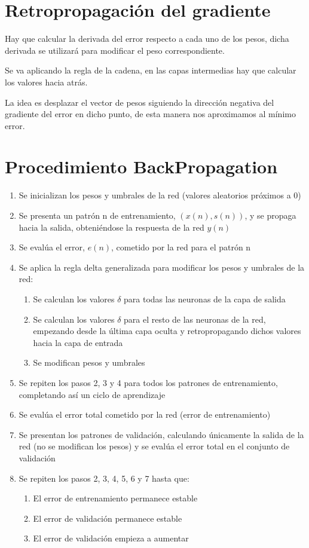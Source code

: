\documentclass[12pt, twoside, openright]{report} %
\begin{document}
\section{Retropropagación del gradiente}
Hay que calcular la derivada del error respecto a cada uno de los pesos, dicha derivada se utilizará para modificar el peso correspondiente.

Se va aplicando la regla de la cadena, en las capas intermedias hay que calcular los valores hacia atrás.

La idea es desplazar el vector de pesos siguiendo la dirección negativa del gradiente del error en dicho punto, de esta manera nos aproximamos al mínimo error.
\section{Procedimiento BackPropagation}
\begin{enumerate}
	\item Se inicializan los pesos y umbrales de la red (valores aleatorios próximos a 0)
	\item Se presenta un patrón n de entrenamiento, $(x(n),s(n))$, y se propaga hacia la salida, obteniéndose la respuesta de la red $y(n)$
	\item Se evalúa el error, $e(n)$, cometido por la red para el patrón n
	\item Se aplica la regla delta generalizada para modificar los pesos y umbrales de la red:
	\begin{enumerate}
		\item Se calculan los valores $\delta$ para todas las neuronas de la capa de salida
		\item Se calculan los valores $\delta$ para el resto de las neuronas de la red, empezando desde la última capa oculta y retropropagando dichos valores hacia la capa de entrada
		\item Se modifican pesos y umbrales
	\end{enumerate}
	\item Se repiten los pasos 2, 3 y 4 para todos los patrones de entrenamiento, completando así un ciclo de aprendizaje
	\item Se evalúa el error total cometido por la red (error de entrenamiento)
	\item Se presentan los patrones de validación, calculando únicamente la salida de la red (no se modifican los pesos) y se evalúa el error total en el conjunto de validación
	\item Se repiten los pasos 2, 3, 4, 5, 6 y 7 hasta que:
	\begin{enumerate}
		\item El error de entrenamiento permanece estable
		\item El error de validación permanece estable
		\item El error de validación empieza a aumentar
	\end{enumerate}
\end{enumerate}
\end{document}
